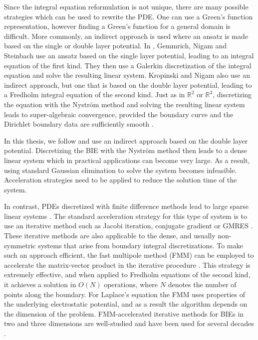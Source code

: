 \documentclass{sfuthesis}
\begin{document}
Since the integral equation reformulation is not unique, there are many possible strategies which can be used to rewrite the PDE. One can use a Green's function representation, however finding a Green's function for a general domain is difficult. More commonly, an indirect approach is used where an ansatz is made based on the single or double layer potential. In \cite{GemmNigStein2008}, Gemmrich, Nigam and Steinbach use an ansatz based on the single layer potential, leading to an integral equation of the first kind. They then use a Galerkin discretization of the integral equation and solve the resulting linear system. Kropinski and Nigam \cite{KropNig2014} also use an indirect approach, but one that is based on the double layer potential, leading to a Fredholm integral equation of the second kind.  Just as in $\mathbb{R}^2$ or $\mathbb{R}^3$, discretizing the equation with the Nystr\"{o}m method and solving the resulting linear system leads to super-algebraic convergence, provided the boundary curve and the Dirichlet boundary data are sufficiently smooth \cite{Atk97,GGM93}.

In this thesis, we follow \cite{KropNig2014} and use an indirect approach based on the double layer potential. Discretizing the BIE with the Nystr\"{o}m method then leads to a dense linear system which in practical applications can become very large. As a result, using standard Gaussian elimination to solve the system becomes infeasible. Acceleration strategies need to be applied to reduce the solution time of the system.  

In contrast, PDEs discretized with finite difference methods lead to large sparse linear systems \cite{Lev2007}. The standard acceleration strategy for this type of system is to use an iterative method such as Jacobi iteration, conjugate gradient or GMRES \cite{Lev2007}. These iterative methods are also applicable to the dense, and usually non-symmetric systems that arise from boundary integral discretizations. To make such an approach efficient, the fast multipole method (FMM) can be employed to accelerate the matrix-vector product in the iterative procedure \cite{CarrGreenRok88, Green88, GreenRok87}. This strategy is extremely effective, and when applied to Fredholm equations of the second kind, it achieves a solution in $O(N)$ operations, where $N$ denotes the number of points along the boundary.
For Laplace's equation the FMM uses properties of the underlying electrostatic potential, and as a result the algorithm depends on the dimension of the problem. FMM-accelerated iterative methods for BIEs in two and three dimensions are well-studied and have been used for several decades \cite{Nish2002}. 
\end{document}
